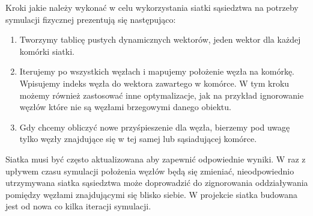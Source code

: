 \documentclass[12pt, letterpaper]{report}
\begin{document}
    Kroki jakie należy wykonać w celu wykorzystania siatki sąsiedztwa na 
    potrzeby symulacji fizycznej prezentują się następująco:
    \begin{enumerate}
        \item Tworzymy tablicę pustych dynamicznych wektorów, jeden wektor dla każdej komórki siatki.

        \item Iterujemy po wszystkich węzłach i mapujemy położenie węzła na komórkę. Wpisujemy indeks węzła 
        do wektora zawartego w komórce. W tym kroku możemy również zastosować inne optymalizacje, jak na przykład 
        ignorowanie węzłów które nie są węzłami brzegowymi danego obiektu.

        \item Gdy chcemy obliczyć nowe przyśpieszenie dla węzła, bierzemy pod uwagę tylko węzły znajdujące 
        się w tej samej lub sąsiadującej komórce.
    \end{enumerate}

    Siatka musi być często aktualizowana aby zapewnić odpowiednie wyniki. W raz z upływem czasu symulacji położenia
    węzłów będą się zmieniać, nieodpowiednio utrzymywana siatka sąsiedztwa może doprowadzić do zignorowania 
    oddziaływania pomiędzy węzłami znajdującymi się blisko siebie. W projekcie siatka budowana jest od nowa 
    co kilka iteracji symulacji.
    
\end{document}

